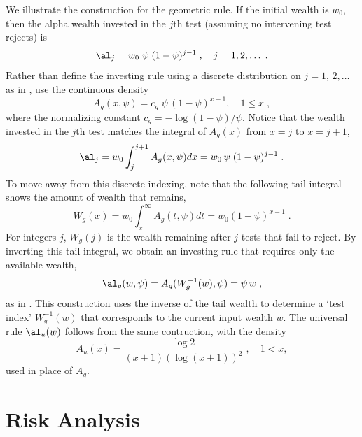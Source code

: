 \documentclass[12pt]{article}
\begin{document}
We illustrate the construction for the geometric rule.  If the initial wealth
 is $w_0$, then the alpha wealth invested in the $j$th test (assuming no
 intervening test rejects) is
 \begin{equation}
    \al_j = w_0\; \psi \; (1-\psi)^{j-1} \;, \quad j = 1, 2, \ldots\;.   
 \label{eq:alj1}
 \end{equation}
  Rather than define the investing rule using a discrete distribution on
 $j=1,\,2,\ldots$ as in , use the continuous density
 \begin{equation}
   A_g(x,\psi) = c_g \; \psi\,(1-\psi)^{x-1}, \quad 1 \le x\;,
 \label{eq:alg}
 \end{equation}
 where the normalizing constant $c_g = -\log (1-\psi)/\psi$.  Notice that the
 wealth invested in the $j$th test  matches the integral of
 $A_g(x)$ from $x=j$ to $x=j+1$,
 \begin{equation}
    \al_j = w_0 \int_j^{j+1} A_g(x,\psi) dx = w_0 \, \psi\; (1-\psi)^{j-1} \;.
 \label{eq:alj2}
 \end{equation}
 To move away from this discrete indexing, note that the following tail integral
 shows the amount of wealth that remains,
 \begin{equation}
    W_g(x) = w_0 \int_x^\infty A_g(t,\psi) dt = w_0 (1-\psi)^{x-1}\;.
 \label{eq:Wg}
 \end{equation}
 For integers $j$, $W_g(j)$ is the wealth remaining after $j$ tests that fail to
 reject.  By inverting this tail integral, we obtain an investing rule that
 requires only the available wealth,
 \begin{equation}
   \al_g(w,\psi) = A_g(W_g^{-1}(w),\psi) = \psi\,w \;,
 \label{eq:Ag}
 \end{equation}
 as in .  This construction uses the inverse of the tail wealth to
 determine a `test index' $W_g^{-1}(w)$ that corresponds to the current input
 wealth $w$.  The universal rule $\al_u(w)$ follows from the same
 contruction, with the density
 \begin{displaymath}
    A_u(x) = \frac{\log 2}{(x+1) (\log(x+1))^2} \;, \quad 1 < x,
 \end{displaymath}
 used in place of $A_g$.

\section{ Risk Analysis}
\end{document}
